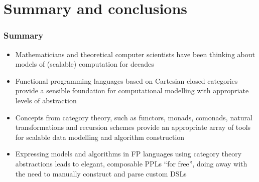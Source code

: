 \documentclass[mathserif,handout]{beamer}
\begin{document}
\section{Summary and conclusions}


\begin{frame}
  \frametitle{Summary}
  \begin{itemize}
  \item Mathematicians and theoretical computer scientists have been thinking about models of (scalable) computation for decades
  \item Functional programming languages based on Cartesian closed categories provide a sensible foundation for computational modelling with appropriate levels of abstraction
  \item Concepts from category theory, such as functors, monads, comonads, natural transformations and recursion schemes provide an appropriate array of tools for scalable data modelling and algorithm construction
    \item Expressing models and algorithms in FP languages using category theory abstractions leads to elegant, composable PPLs ``for free'', doing away with the need to manually construct and parse custom DSLs
  \end{itemize}
\end{frame}
\end{document}

